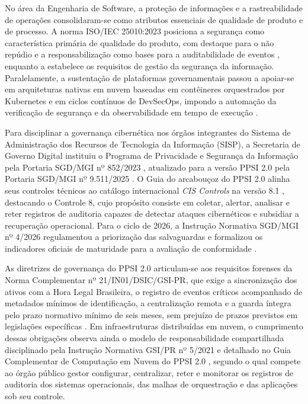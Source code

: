 No área da Engenharia de Software, a proteção de informações e a rastreabilidade de operações consolidaram-se como atributos essenciais de qualidade de produto e de processo. A norma ISO/IEC 25010:2023 posiciona a segurança como característica primária de qualidade do produto, com destaque para o não repúdio e a responsabilização como bases para a auditabilidade de eventos \cite{iso25010_2023}, enquanto a \cite{iso27001_2022} estabelece os requisitos de gestão da segurança da informação. Paralelamente, a sustentação de plataformas governamentais passou a apoiar-se em arquiteturas nativas em nuvem baseadas em contêineres orquestrados por Kubernetes e em ciclos contínuos de DevSecOps, impondo a automação da verificação de segurança e da observabilidade em tempo de execução \cite{fitzgerald2017,rajapakse2022}.

Para disciplinar a governança cibernética nos órgãos integrantes do Sistema de Administração dos Recursos de Tecnologia da Informação (SISP), a Secretaria de Governo Digital instituiu o Programa de Privacidade e Segurança da Informação pela Portaria SGD/MGI nº 852/2023 \cite{portaria852_2023}, atualizado para a versão PPSI 2.0 pela Portaria SGD/MGI nº 9.511/2025 \cite{portaria9511_2025}. O Guia do arcabouçoz do PPSI 2.0 alinha seus controles técnicos ao catálogo internacional \textit{CIS Controls} na versão 8.1 \cite{ppsi2026,cis2024}, destacando o Controle 8, cujo propósito consiste em coletar, alertar, analisar e reter registros de auditoria capazes de detectar ataques cibernéticos e subsidiar a recuperação operacional. Para o ciclo de 2026, a Instrução Normativa SGD/MGI nº 4/2026 regulamentou a priorização das salvaguardas e formalizou os indicadores oficiais de maturidade para a avaliação de conformidade \cite{in4_2026}.

As diretrizes de governança do PPSI 2.0 articulam-se aos requisitos forenses da Norma Complementar nº 21/IN01/DSIC/GSI-PR, que exige a sincronização dos ativos com a Hora Legal Brasileira, o registro de eventos críticos acompanhado de metadados mínimos de identificação, a centralização remota e a guarda íntegra pelo prazo normativo mínimo de seis meses, sem prejuízo de prazos previstos em legislações específicas \cite{nc21_2014}. Em infraestruturas distribuídas em nuvem, o cumprimento dessas obrigações observa ainda o modelo de responsabilidade compartilhada disciplinado pela Instrução Normativa GSI/PR nº 5/2021 \cite{ingsi5_2021} e detalhado no Guia Complementar de Computação em Nuvem do PPSI 2.0 \cite{guianuvem2025}, segundo o qual compete ao órgão público gestor configurar, centralizar, reter e monitorar os registros de auditoria dos sistemas operacionais, das malhas de orquestração e das aplicações sob seu controle.

